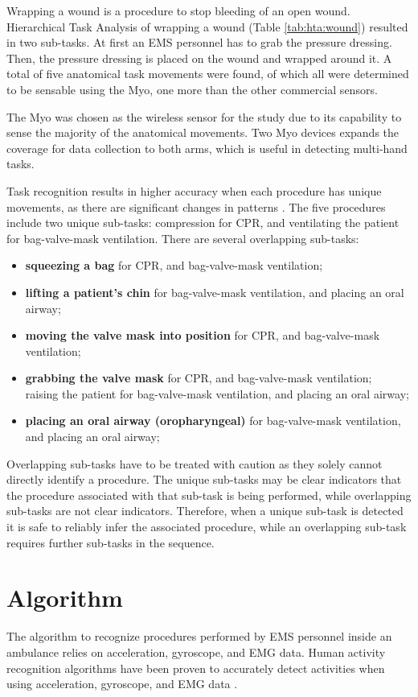 \par Wrapping a wound is a procedure to stop bleeding of an open wound. Hierarchical Task Analysis of wrapping a wound (Table \ref{tab:hta:wound}) resulted in two sub-tasks. At first an EMS personnel has to grab the pressure dressing. Then, the pressure dressing is placed on the wound and wrapped around it. A total of five anatomical task movements were found, of which all were determined to be sensable using the Myo, one more than the other commercial sensors.
\par The Myo was chosen as the wireless sensor for the study due to its capability to sense the majority of the anatomical movements. Two Myo devices expands the coverage for data collection to both arms, which is useful in detecting multi-hand tasks.
\par Task recognition results in higher accuracy when each procedure has unique movements, as there are significant changes in patterns \cite{5370804}. The five procedures include two unique sub-tasks: compression for CPR, and ventilating the patient for bag-valve-mask ventilation. There are several overlapping sub-tasks:
\begin{itemize}
	\item \textbf{squeezing a bag} for CPR, and bag-valve-mask ventilation;
	\item \textbf{lifting a patient's chin} for bag-valve-mask ventilation, and placing an oral airway;
	\item \textbf{moving the valve mask into position} for CPR, and bag-valve-mask ventilation;
	\item \textbf{grabbing the valve mask} for CPR, and bag-valve-mask ventilation;\\raising the patient for bag-valve-mask ventilation, and placing an oral airway;
	\item \textbf{placing an oral airway (oropharyngeal)} for bag-valve-mask ventilation, and placing an oral airway;
\end{itemize}
Overlapping sub-tasks have to be treated with caution as they solely cannot directly identify a procedure. The unique sub-tasks may be clear indicators that the procedure associated with that sub-task is being performed, while overlapping sub-tasks are not clear indicators. Therefore, when a unique sub-task is detected it is safe to reliably infer the associated procedure, while an overlapping sub-task requires further sub-tasks in the sequence.

\section{Algorithm}
\label{sec:Approach:Algorithm}
The algorithm to recognize procedures performed by EMS personnel inside an ambulance relies on acceleration, gyroscope, and EMG data. Human activity recognition algorithms have been proven to accurately detect activities when using acceleration, gyroscope, and EMG data \cite{Totty2017,Benalcazar2017}.

